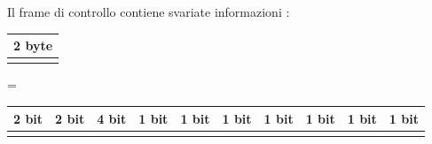 \documentclass[12pt, letterpaper]{article}
\begin{document}
Il frame di controllo contiene svariate informazioni :\begin{center}
    \begin{tabular}{c}
        2 byte                                                                  \\ \hline
        \rowcolor[HTML]{ECF4FF} 
        \multicolumn{1}{|c|}{\cellcolor[HTML]{ECF4FF}{\color[HTML]{000000} FC}} \\ \hline
        \end{tabular}
        \huge = \normalsize
    \begin{tabular}{cccccccccc}
        2 bit                                                                                                                               & 2 bit                                                                    & 4 bit                                                                                                                     & 1 bit                                                                                                                & 1 bit                                                                                                                  & 1 bit                                                                                                                   & 1 bit                                                                     & 1 bit                                                                                                                    & 1 bit                                                                   & 1 bit                                             \\ \hline
        \rowcolor[HTML]{CBCEFB} 

\end{tabular}
\end{center}
\end{document}

